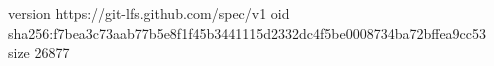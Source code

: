 version https://git-lfs.github.com/spec/v1
oid sha256:f7bea3c73aab77b5e8f1f45b3441115d2332dc4f5be0008734ba72bffea9cc53
size 26877
